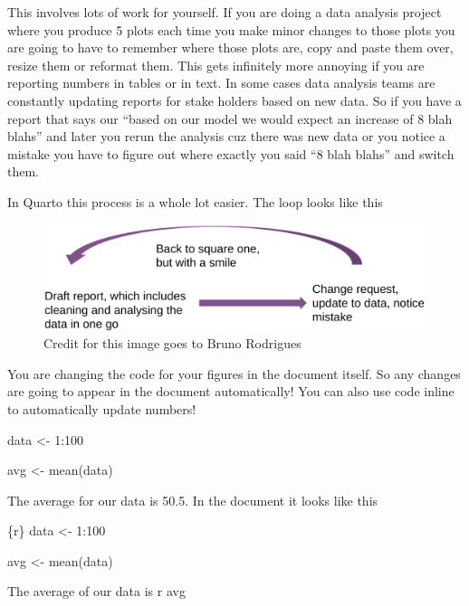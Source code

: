 \documentclass[
  letterpaper,
  DIV=11,
  numbers=noendperiod,
  oneside]{scrreprt}
\newenvironment{Shaded}{\begin{snugshade}}{\end{snugshade}}
\newcommand{\DecValTok}[1]{\textcolor[rgb]{0.68,0.00,0.00}{#1}}
\newcommand{\FunctionTok}[1]{\textcolor[rgb]{0.28,0.35,0.67}{#1}}
\newcommand{\InformationTok}[1]{\textcolor[rgb]{0.37,0.37,0.37}{#1}}
\newcommand{\NormalTok}[1]{\textcolor[rgb]{0.00,0.23,0.31}{#1}}
\newcommand{\OtherTok}[1]{\textcolor[rgb]{0.00,0.23,0.31}{#1}}
\newcommand{\SpecialCharTok}[1]{\textcolor[rgb]{0.37,0.37,0.37}{#1}}
\begin{document}
This involves lots of work for yourself. If you are doing a data
analysis project where you produce 5 plots each time you make minor
changes to those plots you are going to have to remember where those
plots are, copy and paste them over, resize them or reformat them. This
gets infinitely more annoying if you are reporting numbers in tables or
in text. In some cases data analysis teams are constantly updating
reports for stake holders based on new data. So if you have a report
that says our ``based on our model we would expect an increase of 8 blah
blahs'' and later you rerun the analysis cuz there was new data or you
notice a mistake you have to figure out where exactly you said ``8 blah
blahs'' and switch them.

In Quarto this process is a whole lot easier. The loop looks like this

\begin{figure}

{\centering \includegraphics[width=6in,height=\textheight]{figs/md_draft_loop.png}

}

\caption{Credit for this image goes to Bruno Rodrigues}

\end{figure}

You are changing the code for your figures in the document itself. So
any changes are going to appear in the document automatically! You can
also use code inline to automatically update numbers!

\begin{Shaded}
\begin{Highlighting}[]
\NormalTok{data }\OtherTok{\textless{}{-}} \DecValTok{1}\SpecialCharTok{:}\DecValTok{100}

\NormalTok{avg }\OtherTok{\textless{}{-}} \FunctionTok{mean}\NormalTok{(data)}
\end{Highlighting}
\end{Shaded}

The average for our data is 50.5. In the document it looks like this

\begin{Shaded}
\begin{Highlighting}[]

\InformationTok{\textasciigrave{}\textasciigrave{}\textasciigrave{}\{r\}}
\NormalTok{data }\OtherTok{\textless{}{-}} \DecValTok{1}\SpecialCharTok{:}\DecValTok{100}

\NormalTok{avg }\OtherTok{\textless{}{-}} \FunctionTok{mean}\NormalTok{(data)}

\InformationTok{\textasciigrave{}\textasciigrave{}\textasciigrave{}}


\NormalTok{The average of our data is }\InformationTok{\textasciigrave{}r avg\textasciigrave{}}
\end{Highlighting}
\end{Shaded}
\end{document}
